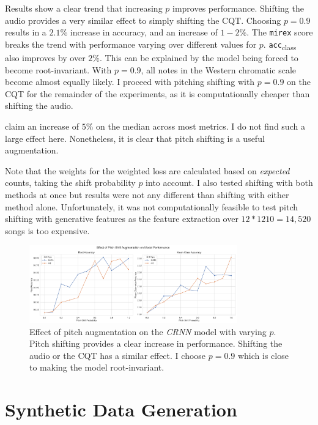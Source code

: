 Results show a clear trend that increasing $p$ improves performance. Shifting the audio provides a very similar effect to simply shifting the CQT. Choosing $p=0.9$ results in a $2.1\%$ increase in accuracy, and an increase of $1-2\%$. The \texttt{mirex} score breaks the trend with performance varying over different values for $p$. \texttt{acc}\textsubscript{class} also improves by over $2\%$. This can be explained by the model being forced to become root-invariant. With $p=0.9$, all notes in the Western chromatic scale become almost equally likely. I proceed with pitching shifting with $p=0.9$ on the CQT for the remainder of the experiments, as it is computationally cheaper than shifting the audio.

\citet{StructuredTraining} claim an increase of $5\%$ on the median across most metrics. I do not find such a large effect here. Nonetheless, it is clear that pitch shifting is a useful augmentation.

Note that the weights for the weighted loss are calculated based on \emph{expected} counts, taking the shift probability $p$ into account. I also tested shifting with both methods at once but results were not any different than shifting with either method alone. Unfortunately, it was not computationally feasible to test pitch shifting with generative features as the feature extraction over $12 * 1210 = 14,520$ songs is too expensive.

\begin{figure}[H]
    \centering
    \includegraphics[width=0.8\textwidth]{figures/pitch_shift_analysis.png}
    \caption{Effect of pitch augmentation on the \emph{CRNN} model with varying $p$. Pitch shifting provides a clear increase in performance. Shifting the audio or the CQT has a similar effect. I choose $p=0.9$ which is close to making the model root-invariant.}\label{fig:pitch_augmentation}
\end{figure}


\section{Synthetic Data Generation}\label{sec:synthetic_data}

